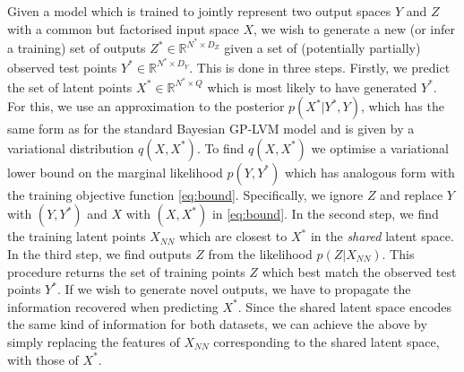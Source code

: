 Given a model which is trained to jointly represent two output spaces
$Y$ and $Z$ with a common but factorised input space $X$, we wish to
generate a new (or infer a training) set of outputs $Z^* \in
\mathbb{R}^{N^* \times D_Z}$ given a set of (potentially partially)
observed test points $Y^* \in \mathbb{R}^{N^* \times D_Y}$.  This is
done in three steps. Firstly, we predict the set of latent points $X^*
\in \mathbb{R}^{N^* \times Q}$ which is most likely to have generated
$Y^*$. For this, we use an approximation to the posterior
$p(X^*|Y^*,Y)$, which has the same form as for the standard Bayesian
GP-LVM model \cite{Titsias:bayesGPLVM10} and is given by a variational
distribution $q(X,X^*)$. To find $q(X,X^*)$ we optimise a variational
lower bound on the marginal likelihood $p(Y,Y^*)$ which has analogous
form with the training objective function
\eqref{eq:bound}. Specifically, we ignore $Z$ and replace $Y$ with
$(Y,Y^*)$ and $X$ with $(X,X^*)$ in \eqref{eq:bound}.
In the second step, we find the training latent points $X_{NN}$ which
are closest to $X^*$ in the \emph{shared} latent space.  In the third
step, we find outputs $Z$ from the likelihood $p(Z | X_{NN})$.  This
procedure returns the set of training points $Z$ which best match the
observed test points $Y^*$.  If we wish to generate novel outputs, we
have to propagate the information recovered when predicting $X^*$.
Since the shared latent space encodes the same kind of information for
both datasets, we can achieve the above by simply replacing the
features of $X_{NN}$ corresponding to the shared latent space, with
those of $X^*$.
%




